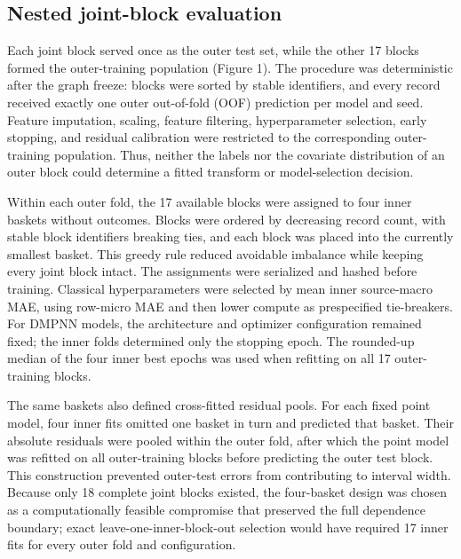 \documentclass[referee,lineno,pdflatex,Numbered,sn-basic]{sn-jnl}
\begin{document}
\subsection{Nested joint-block evaluation}

Each joint block served once as the outer test set, while the other 17 blocks formed the outer-training population (Figure 1). The procedure was deterministic after the graph freeze: blocks were sorted by stable identifiers, and every record received exactly one outer out-of-fold (OOF) prediction per model and seed. Feature imputation, scaling, feature filtering, hyperparameter selection, early stopping, and residual calibration were restricted to the corresponding outer-training population. Thus, neither the labels nor the covariate distribution of an outer block could determine a fitted transform or model-selection decision.

Within each outer fold, the 17 available blocks were assigned to four inner baskets without outcomes. Blocks were ordered by decreasing record count, with stable block identifiers breaking ties, and each block was placed into the currently smallest basket. This greedy rule reduced avoidable imbalance while keeping every joint block intact. The assignments were serialized and hashed before training. Classical hyperparameters were selected by mean inner source-macro MAE, using row-micro MAE and then lower compute as prespecified tie-breakers. For DMPNN models, the architecture and optimizer configuration remained fixed; the inner folds determined only the stopping epoch. The rounded-up median of the four inner best epochs was used when refitting on all 17 outer-training blocks.

The same baskets also defined cross-fitted residual pools. For each fixed point model, four inner fits omitted one basket in turn and predicted that basket. Their absolute residuals were pooled within the outer fold, after which the point model was refitted on all outer-training blocks before predicting the outer test block. This construction prevented outer-test errors from contributing to interval width. Because only 18 complete joint blocks existed, the four-basket design was chosen as a computationally feasible compromise that preserved the full dependence boundary; exact leave-one-inner-block-out selection would have required 17 inner fits for every outer fold and configuration.
\end{document}
